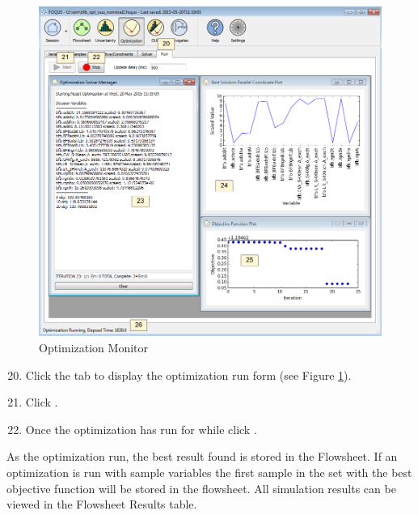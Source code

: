 \begin{figure}[H] 
	\begin{center}
		\includegraphics[scale=0.50]{Chapt_optimization/figs/optRun}
		\caption{Optimization Monitor}
		\label{tut.opt.run}
	\end{center}
\end{figure}

\begin{enumerate}
	\setcounter{enumi}{19}
	\item Click the  tab to display the optimization run form (see Figure \ref{tut.opt.run}).
	\item Click .
	\item Once the optimization has run for while click .
\end{enumerate}

As the optimization run, the best result found is stored in the Flowsheet. If an optimization is run with sample variables the first sample in the set with the best objective function will be stored in the flowsheet. All simulation results can be viewed in the Flowsheet Results table.

